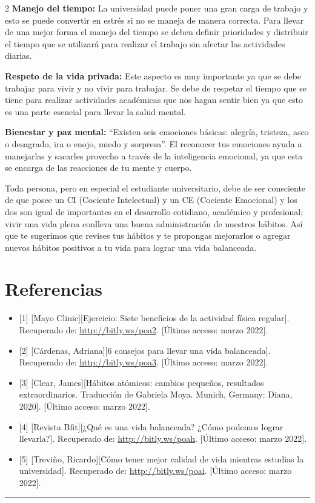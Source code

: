 \documentclass[12pt,spanish,Letterpaper,openany]{book}
\newcommand{\HRule}{\begin{center}\rule{0.5\linewidth}{0.2mm}\end{center}}
\begin{document}
\begin {multicols}{2}
\textbf{Manejo del tiempo:} La universidad puede poner una gran carga de trabajo y esto se puede convertir en estrés si no se maneja de manera correcta. Para llevar de una mejor forma el manejo del tiempo se deben definir prioridades y distribuir el tiempo que se utilizará para realizar el trabajo sin afectar las actividades diarias.

\textbf{Respeto de la vida privada:} Este aspecto es muy importante ya que se debe trabajar para vivir y no vivir para trabajar. Se debe de respetar el tiempo que se tiene para realizar actividades académicas que nos hagan sentir bien ya que esto es una parte esencial para llevar la salud mental.

\textbf{Bienestar y paz mental:} ``Existen seis emociones básicas: alegría, tristeza, asco o desagrado, ira o enojo, miedo y sorpresa''. El reconocer tus emociones ayuda a manejarlas y sacarles provecho a través de la inteligencia emocional, ya que esta se encarga de las reacciones de tu mente y cuerpo.

Toda persona, pero en especial el estudiante universitario, debe de ser consciente de que posee un CI (Cociente Intelectual) y un CE (Cociente Emocional) y los dos son igual de importantes en el desarrollo cotidiano, académico y profesional; vivir una vida plena conlleva una buena administración de nuestros hábitos. Así que te sugerimos que revises tus hábitos y te propongas mejorarlos o agregar nuevos hábitos positivos a tu vida para lograr una vida balanceada.

\hypertarget{referencias-15}{%
\section{Referencias}\label{referencias-15}}

\begin{itemize}
\item
  {[}1{]} {[}Mayo Clinic{]}{[}Ejercicio: Siete beneficios de la actividad física regular{]}. Recuperado de: \url{http://bitly.ws/poa2}. {[}Último acceso: marzo 2022{]}.
\item
  {[}2{]} {[}Cárdenas, Adriana{]}{[}6 consejos para llevar una vida balanceada{]}. Recuperado de: \url{http://bitly.ws/poa3}. {[}Último acceso: marzo 2022{]}.
\item
  {[}3{]} {[}Clear, James{]}{[}Hábitos atómicos: cambios pequeños, resultados extraordinarios. Traducción de Gabriela Moya. Munich, Germany: Diana, 2020{]}. {[}Último acceso: marzo 2022{]}.
\item
  {[}4{]} {[}Revista Bfit{]}{[}¿Qué es una vida balanceada? ¿Cómo podemos lograr llevarla?{]}. Recuperado de: \url{http://bitly.ws/poah}. {[}Último acceso: marzo 2022{]}.
\item
  {[}5{]} {[}Treviño, Ricardo{]}{[}Cómo tener mejor calidad de vida mientras estudias la universidad{]}. Recuperado de: \url{http://bitly.ws/poai}. {[}Último acceso: marzo 2022{]}.
\end{itemize}

\end {multicols}
\medskip
\HRule
\medskip
\end{document}
